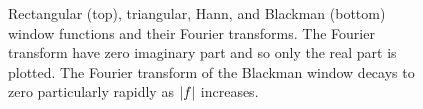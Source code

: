 {\begin{figure}[p]
\caption{Rectangular (top), triangular, Hann, and Blackman (bottom) window functions and their Fourier transforms. The Fourier transform have zero imaginary part and so only the real part is plotted.  The Fourier transform of the Blackman window decays to zero particularly rapidly as $\left\vert f \right\vert$ increases.} \label{fig:windowfunctions}
\end{figure}
}



